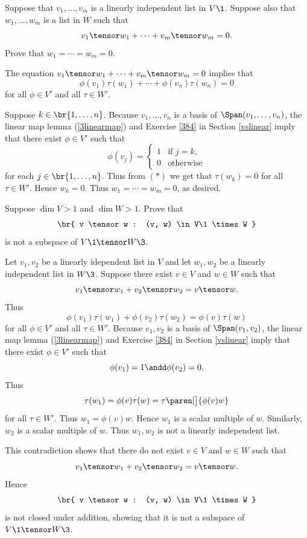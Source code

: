 \exercise
Suppose that $v_1, \ldots, v_m$ is a linearly independent list in $V\1$. Suppose also that $w_1, \ldots, w_m$ is a list in $W$ such that
\[
v_1 \tensor w_1 + \cdots + v_m \tensor w_m = 0.
\]
Prove that $w_1 = \cdots = w_m = 0$.

\begin{Solution}
The equation $v_1 \tensor w_1 + \cdots + v_m \tensor w_m = 0$ implies that
\[
\phi(v_1) \tau(w_1) + \cdots + \phi(v_n) \tau(w_n) = 0 \tag{(*)}
\]
for all $\phi \in V'$ and all $\tau \in W'\!$.

Suppose $k \in \br{1, \ldots, n}$. Because $v_1, \ldots, v_n$ is a basis of $\Span(v_1, \ldots, v_n)$, the linear map lemma (\ref{3linearmap}) and Exercise \ref{384} in Section \ref{vslinear} imply that there exist $\phi \in V'$ such that
\[
\phi(v_j) = \begin{cases}
1 & \text{if } j = k,\\
0 & \text{otherwise}
\end{cases}
\]
for each $j \in \br{1, \ldots, n}$. Thus from $(*)$ we get that $\tau(w_k) = 0$ for all $\tau \in W'\!$. Hence $w_k = 0$.
Thus $w_1 = \cdots = w_m = 0$, as desired.
\end{Solution}

\exercise
Suppose $\dim V > 1$ and $\dim W > 1$. Prove that\label{9VtenW}
\[
\br{ v \tensor w : (v, w) \in V\1 \times W }
\]
is not a subspace of $V\1 \tensor W\3$.
\vspace{-10bp}

\begin{Solution}
Let $v_1, v_2$ be a linearly idependent list in $V$ and let $w_1, w_2$ be a linearly independent list in $W\3$. Suppose there exist $v \in V$ and $w \in W$ such that
\[
v_1 \tensor w_1 + v_2 \tensor w_2 = v \tensor w.
\]
Thus
\[
\phi(v_1)  \tau(w_1) + \phi(v_2) \tau(w_2) = \phi(v) \tau(w)
\]
for all $\phi \in V'$ and all $\tau \in W'\!$. Because $v_1, v_2$ is a basis of $\Span(v_1, v_2)$, the linear map lemma (\ref{3linearmap}) and Exercise \ref{384} in Section \ref{vslinear} imply that there exist $\phi \in V'$ such that
\[
\phi(v_1) = 1 \andd \phi(v_2) = 0.
\]
Thus
\[
\tau(w_1) = \phi(v) \tau(w) = \tau\paren[\big]{ \phi(v) w }
\]
for all $\tau \in W'\!$. Thus $w_1 = \phi(v) w$. Hence $w_1$ is a scalar multiple of $w$. Similarly, $w_2$ is a scalar multiple of $w$. Thus $w_1, w_2$ is not a linearly independent list.

This contradiction shows that there do not exist $v \in V$ and $w \in W$ such that
\[
v_1 \tensor w_1 + v_2 \tensor w_2 = v \tensor w.
\]
Hence
\[
\br{ v \tensor w : (v, w) \in V\1 \times W }
\]
is not closed under addition, showing that it is not a subspace of $V\1 \tensor W\3$.
\end{Solution}

